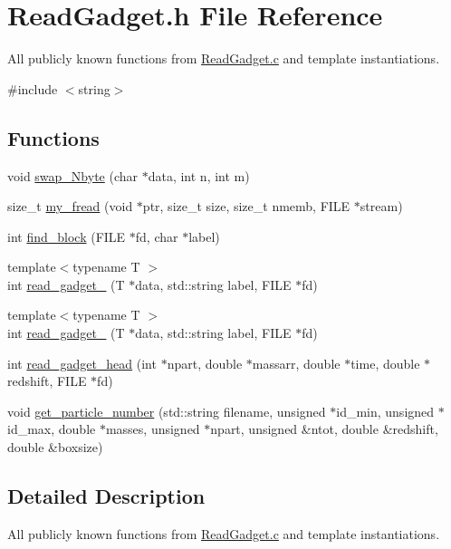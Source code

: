 \section{ReadGadget.h File Reference}
\label{ReadGadget_8h}


All publicly known functions from \hyperlink{ReadGadget_8c}{ReadGadget.c} and template instantiations.  


{\ttfamily \#include $<$string$>$}\par
\subsection*{Functions}
\begin{DoxyCompactItemize}
\item 
void \hyperlink{ReadGadget_8h_a5521647d705d1b38d62f6c497d6ce8dc}{swap\_\-Nbyte} (char $\ast$data, int n, int m)
\item 
size\_\-t \hyperlink{ReadGadget_8h_a1609620c03f6b0068601735c42e3c660}{my\_\-fread} (void $\ast$ptr, size\_\-t size, size\_\-t nmemb, FILE $\ast$stream)
\item 
int \hyperlink{ReadGadget_8h_ac8dbc7568a52801fefe47be7fb92c69c}{find\_\-block} (FILE $\ast$fd, char $\ast$label)
\item 
{\footnotesize template$<$typename T $>$ }\\int \hyperlink{ReadGadget_8h_a82dcfc276c58b845497a7ac210b79fa4}{read\_\-gadget\_} (T $\ast$data, std::string label, FILE $\ast$fd)
\item 
{\footnotesize template$<$typename T $>$ }\\int \hyperlink{ReadGadget_8h_ad94fb9be5ec96b09a94fa083db81463c}{read\_\-gadget\_} (T $\ast$data, std::string label, FILE $\ast$fd)
\item 
int \hyperlink{ReadGadget_8h_acbadd26f5dfcab3e523db042f0b01209}{read\_\-gadget\_\-head} (int $\ast$npart, double $\ast$massarr, double $\ast$time, double $\ast$redshift, FILE $\ast$fd)
\item 
void \hyperlink{ReadGadget_8h_a275b45dee34efc2ef2f3bb402ca17993}{get\_\-particle\_\-number} (std::string filename, unsigned $\ast$id\_\-min, unsigned $\ast$id\_\-max, double $\ast$masses, unsigned $\ast$npart, unsigned \&ntot, double \&redshift, double \&boxsize)
\end{DoxyCompactItemize}


\subsection{Detailed Description}
All publicly known functions from \hyperlink{ReadGadget_8c}{ReadGadget.c} and template instantiations. 


